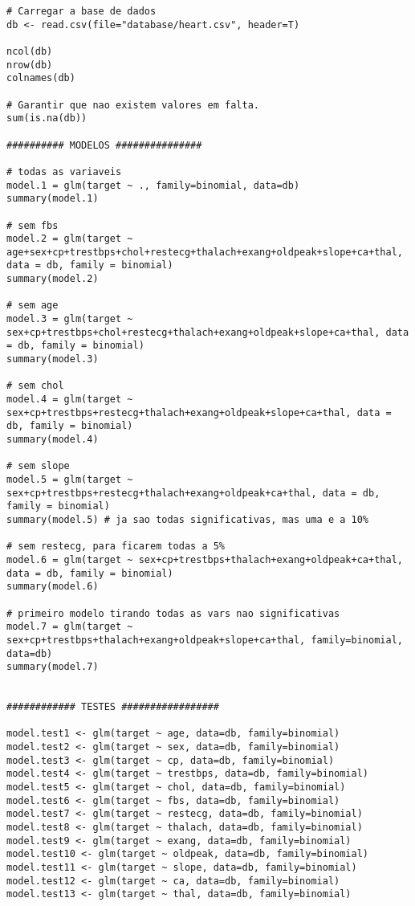 \documentclass[a4paper]{report}
\begin{document}
\begin{lstlisting}[breaklines,basicstyle=\small]
# Carregar a base de dados
db <- read.csv(file="database/heart.csv", header=T)

ncol(db)
nrow(db)
colnames(db)

# Garantir que nao existem valores em falta.
sum(is.na(db))

########## MODELOS ###############

# todas as variaveis
model.1 = glm(target ~ ., family=binomial, data=db)
summary(model.1)

# sem fbs
model.2 = glm(target ~ age+sex+cp+trestbps+chol+restecg+thalach+exang+oldpeak+slope+ca+thal, data = db, family = binomial)
summary(model.2)

# sem age
model.3 = glm(target ~ sex+cp+trestbps+chol+restecg+thalach+exang+oldpeak+slope+ca+thal, data = db, family = binomial)
summary(model.3) 

# sem chol
model.4 = glm(target ~ sex+cp+trestbps+restecg+thalach+exang+oldpeak+slope+ca+thal, data = db, family = binomial)
summary(model.4)

# sem slope
model.5 = glm(target ~ sex+cp+trestbps+restecg+thalach+exang+oldpeak+ca+thal, data = db, family = binomial)
summary(model.5) # ja sao todas significativas, mas uma e a 10%

# sem restecg, para ficarem todas a 5%
model.6 = glm(target ~ sex+cp+trestbps+thalach+exang+oldpeak+ca+thal, data = db, family = binomial)
summary(model.6) 

# primeiro modelo tirando todas as vars nao significativas
model.7 = glm(target ~ sex+cp+trestbps+thalach+exang+oldpeak+slope+ca+thal, family=binomial, data=db)
summary(model.7)


############ TESTES #################

model.test1 <- glm(target ~ age, data=db, family=binomial)
model.test2 <- glm(target ~ sex, data=db, family=binomial)
model.test3 <- glm(target ~ cp, data=db, family=binomial)
model.test4 <- glm(target ~ trestbps, data=db, family=binomial)
model.test5 <- glm(target ~ chol, data=db, family=binomial)
model.test6 <- glm(target ~ fbs, data=db, family=binomial)
model.test7 <- glm(target ~ restecg, data=db, family=binomial)
model.test8 <- glm(target ~ thalach, data=db, family=binomial)
model.test9 <- glm(target ~ exang, data=db, family=binomial)
model.test10 <- glm(target ~ oldpeak, data=db, family=binomial)
model.test11 <- glm(target ~ slope, data=db, family=binomial)
model.test12 <- glm(target ~ ca, data=db, family=binomial)
model.test13 <- glm(target ~ thal, data=db, family=binomial)


\end{lstlisting}
\end{document}
